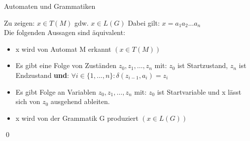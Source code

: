 \begin{frame}[fragile]{Automaten und Grammatiken}
    \begin{alertblock}{Zu zeigen: $x \in T(M)$ gdw. $x \in L(G)$}
    Dabei gilt: $x=a_1 a_2 ... a_n$\\
    Die folgenden Aussagen sind äquivalent:
        \begin{itemize}
            \item x wird von Automat M erkannt \emph{$(x\in T(M))$}
            \item Es gibt eine Folge von Zuständen $z_0, z_1, \dots, z_n$ mit: $z_0$ ist Startzustand, $z_n$ ist Endzustand \textbf{und}: $\forall i \in \{1, ..., n\}: \delta(z_{i-1}, a_i)=z_i$
            \item Es gibt Folge an Variablen $z_0, z_1, \dots, z_n$ mit: $z_0$ ist Startvariable und x lässt sich von $z_0$ ausgehend ableiten.
            \item x wird von der Grammatik G produziert \emph{$(x \in L(G))$}
        \end{itemize}
        \qed
    \end{alertblock}
\end{frame}



        
